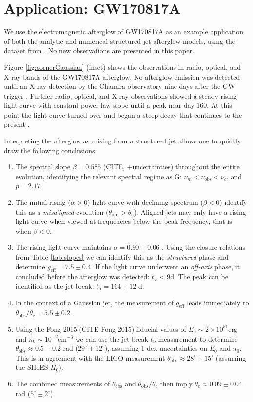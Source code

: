 \documentclass[twocolumn]{aastex62}
\newcommand{\gwbns}{GW170817A}
\newcommand{\tW}{\ensuremath{t_{\mathrm{w}}}}
\newcommand{\tb}{\ensuremath{t_{\mathrm{b}}}}
\newcommand{\nuobs}{\ensuremath{\nu_{\mathrm{obs}}}}
\newcommand{\thobs}{\ensuremath{\theta_{\mathrm{obs}}}}
\newcommand{\thC}{\ensuremath{\theta_{\mathrm{c}}}}
\newcommand{\geff}{\ensuremath{g_{\mathrm{eff}}}}
\begin{document}
%
%

\section{Application: \gwbns{}}\label{sec:gw170817}

We use the electromagnetic afterglow of \gwbns{} as an example application of both the analytic and numerical structured jet afterglow models, using the dataset from \citet{Troja:2019ab}. No new observations are presented in this paper.

Figure \ref{fig:cornerGaussian} (inset) shows the observations in radio, optical, and X-ray bands of the \gwbns{} afterglow.  No afterglow emission was detected until an X-ray detection by the Chandra observatory nine days after the GW trigger \cite{Troja:2017aa}.  Further radio, optical, and X-ray observations showed a steady rising light curve with constant power law slope until a peak near day 160.  At this point the light curve turned over and began a steep decay that continues to the present \citep{Troja:2019ab}.

Interpreting the afterglow as arising from a structured jet allows one to quickly draw the following conclusions:
\begin{enumerate}
	\item The spectral slope $\beta = 0.585$ (CITE, +uncertainties) throughout the entire evolution, identifying the relevant spectral regime as G: $\nu_m < \nuobs < \nu_c$, and $p = 2.17$.
	\item The initial rising ($\alpha > 0$) light curve with declining spectrum ($\beta < 0$) identify this as a \emph{misaligned} evolution ($\thobs > \thC$).  Aligned jets may only have a rising light curve when viewed at frequencies below the peak frequency, that is when $\beta < 0$.
	\item The rising light curve maintains $\alpha  = 0.90 \pm 0.06$ \citep{Troja:2019ab}.  Using the closure relations from Table \ref{tab:slopes} we can identify this as the \emph{structured} phase and determine $\geff = 7.5 \pm 0.4$.  If the light curve underwent an \emph{off-axis} phase, it concluded before the afterglow was detected: $\tW < 9$d.  The peak can be identified as the jet-break: $\tb = 164 \pm 12$ d.
	\item In the context of a Gaussian jet, the measurement of $\geff$ leads immediately to $\thobs / \thC = 5.5 \pm 0.2$.
	\item Using the Fong 2015 (CITE Fong 2015) fiducial values of $E_0 \sim 2\times 10^{51}$erg and $n_0 \sim 10^{-2}$cm$^{-3}$ we can use the jet break $\tb$ measurement to determine $\thobs \approx 0.5 \pm 0.2$ rad ($29^\circ \pm 12^\circ$), assuming 1 dex uncertainties on $E_0$ and $n_0$.    This is in agreement with the LIGO measurement $\thobs \approx 28^\circ \pm 15^\circ$ (assuming the SHoES $H_0$).
	\item The combined measurements of $\thobs$ and $\thobs/\thC$ then imply $\thC \approx 0.09 \pm 0.04$ rad ($5^\circ  \pm 2^\circ$).
\end{enumerate}
\end{document}
